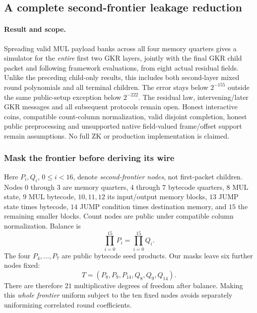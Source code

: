 \subsection{A complete second-frontier leakage reduction}\label{note:zk-second-frontier}

\paragraph{Result and scope.} Spreading valid MUL payload banks across all four memory quarters gives a simulator for the \emph{entire} first two GKR layers, jointly with the final GKR child packet and following framework evaluations, from eight actual residual fields. Unlike the preceding child-only results, this includes both second-layer mixed round polynomials and all terminal children. The error stays below $2^{-155}$ outside the same public-setup exception below $2^{-222}$. The residual law, intervening/later GKR messages and all subsequent protocols remain open. Honest interactive coins, compatible count-column normalization, valid disjoint completion, honest public preprocessing and unsupported native field-valued frame/offset support remain assumptions. No full ZK or production implementation is claimed.

\subsubsection{Mask the frontier before deriving its wire}

Here $P_i,Q_i$, $0\le i<16$, denote \emph{second-frontier nodes}, not first-packet children. Nodes $0$ through $3$ are memory quarters, $4$ through $7$ bytecode quarters, $8$ MUL state, $9$ MUL bytecode, $10,11,12$ its input/output memory blocks, $13$ JUMP state times bytecode, $14$ JUMP condition times destination memory, and $15$ the remaining smaller blocks. Count nodes are public under compatible column normalization. Balance is
\[
 \prod_{i=0}^{15}P_i=\prod_{i=0}^{15}Q_i.
\]
The four $P_4,\ldots,P_7$ are public bytecode seed products. Our masks leave six further nodes fixed:
\[
 T=(P_8,P_9,P_{14},Q_8,Q_9,Q_{14}).
\]
There are therefore $21$ multiplicative degrees of freedom after balance. Making this \emph{whole frontier} uniform subject to the ten fixed nodes avoids separately uniformizing correlated round coefficients.

